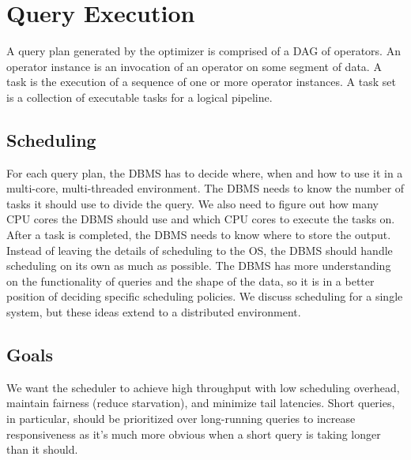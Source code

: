 \documentclass[11pt]{article}
\begin{document}
\maketitle
\thispagestyle{plain}

\section{Query Execution}
A query plan generated by the optimizer is comprised of a DAG of operators. An operator instance is an 
invocation of an operator on some segment of data. A task is the execution of a sequence of one or 
more operator instances. A task set is a collection of executable tasks for a logical pipeline.


\subsection*{Scheduling} 
For each query plan, the DBMS has to decide where, when and how to use it in a multi-core, 
multi-threaded environment. The DBMS needs to know the number of tasks it should use to divide the 
query. We also need to figure out how many CPU cores the DBMS should use and which CPU cores to 
execute the tasks on. After a task is completed, the DBMS needs to know where to store the output. 
Instead of leaving the details of scheduling to the OS, the DBMS should handle scheduling on its own 
as much as possible. The DBMS has more understanding on the functionality of queries and the shape 
of the data, so it is in a better position of deciding specific scheduling policies. We discuss scheduling
for a single system, but these ideas extend to a distributed environment.

\subsection*{Goals} 
We want the scheduler to achieve high throughput with low scheduling overhead, maintain fairness 
(reduce starvation), and minimize tail latencies. Short queries, in particular, should be prioritized
over long-running queries to increase responsiveness as it's much more obvious when a short query
is taking longer than it should.
\end{document}
